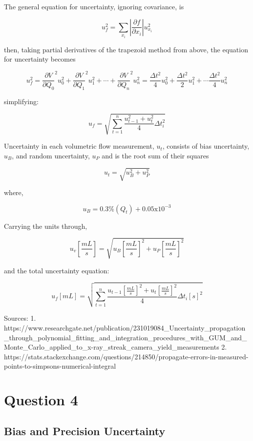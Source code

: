 \documentclass[11pt]{article}
\begin{document}
The general equation for uncertainty, ignoring covariance, is

\[u_f^2=\sum_{x_i}\left|\frac{\partial f}{\partial x_i}\right| u_{x_i}^2\]

then, taking partial derivatives of the trapezoid method from above, the
equation for uncertainty becomes

\[u_f^2 = \frac{\partial V}{\partial Q_0}^2 u_{0}^{2} + \frac{\partial V}{\partial Q_1}^2 u_{1}^{2} + \cdots + \frac{\partial V}{\partial Q_n}^2 u_{n}^{2} = \frac{\Delta t^2}{4} u_0^2 + \frac{\Delta t^2}{2} u_1^2 + \cdots \frac{\Delta t^2}{4} u_n^2\]

simplifying:

\[u_f = \sqrt{\sum_{t=1}^n \frac{u_{t-1}^2 + u_t^2}{4} \Delta t_i^2}\]

    Uncertainty in each volumetric flow measurement, \(u_t\), consists of
bias uncertainty, \(u_B\), and random uncertainty, \(u_P\) and is the
root sum of their squares

\[u_t = \sqrt{u_{B}^{2} + u_{P}^{2}}\]

where,

\[u_B = 0.3\% (Q_t) + 0.05\text{x10}^{-3}\]

Carrying the units through,

\[u_v \left[\frac{mL}{s}\right]= \sqrt{{u_{B} \left[\frac{mL}{s}\right]}^{2} + {u_{P} \left[\frac{mL}{s}\right]}^{2}}\]

and the total uncertainty equation:

\[u_f [mL] = \sqrt{\sum_{t=1}^n \frac{{u_{t-1}\left[\frac{mL}{s}\right]}^2 + {u_t \left[\frac{mL}{s}\right]}^2}{4} \Delta t_i [s]^2}\]

    Sources: 1.
https://www.researchgate.net/publication/231019084\_Uncertainty\_propagation\_through\_polynomial\_fitting\_and\_integration\_procedures\_with\_GUM\_and\_Monte\_Carlo\_applied\_to\_x-ray\_streak\_camera\_yield\_measurements
2.
https://stats.stackexchange.com/questions/214850/propagate-errors-in-measured-points-to-simpsons-numerical-integral

    \hypertarget{question-4}{%
\section{Question 4}\label{question-4}}

    \hypertarget{bias-and-precision-uncertainty}{%
\subsection{Bias and Precision
Uncertainty}\label{bias-and-precision-uncertainty}}
\end{document}
